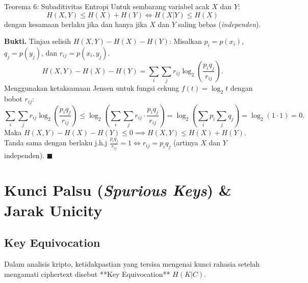 \documentclass[11pt,a4paper]{article}
\newenvironment{proof}{\noindent\textbf{Bukti.}}{\hfill$\blacksquare$\vspace{0.3em}}
\begin{document}
\begin{thmbox}{Teorema 6: Subaditivitas Entropi}
Untuk sembarang variabel acak $X$ dan $Y$:
\begin{equation}
\label{eq:subadditivity}
H(X, Y) \le H(X) + H(Y) \iff H(X|Y) \le H(X)
\end{equation}
dengan kesamaan berlaku jika dan hanya jika $X$ dan $Y$ saling bebas (\textit{independen}).
\end{thmbox}
\begin{proof}
Tinjau selisih $H(X, Y) - H(X) - H(Y)$:
Misalkan $p_i = p(x_i)$, $q_j = p(y_j)$, dan $r_{ij} = p(x_i, y_j)$.
\[
H(X, Y) - H(X) - H(Y) = \sum_{i} \sum_{j} r_{ij} \log_2\left(\frac{p_i q_j}{r_{ij}}\right).
\]
Menggunakan ketaksamaan Jensen untuk fungsi cekung $f(t) = \log_2 t$ dengan bobot $r_{ij}$:
\[
\sum_{i} \sum_{j} r_{ij} \log_2\left(\frac{p_i q_j}{r_{ij}}\right) \le \log_2\left( \sum_{i}\sum_{j} r_{ij} \cdot \frac{p_i q_j}{r_{ij}} \right) = \log_2\left(\sum_{i} p_i \sum_{j} q_j\right) = \log_2(1 \cdot 1) = 0.
\]
Maka $H(X, Y) - H(X) - H(Y) \le 0 \implies H(X, Y) \le H(X) + H(Y)$.
Tanda sama dengan berlaku j.h.j $\frac{p_i q_j}{r_{ij}} = 1 \iff r_{ij} = p_i q_j$ (artinya $X$ dan $Y$ independen).
\end{proof}

\section{Kunci Palsu (\textit{Spurious Keys}) \& Jarak Unicity}

\subsection{Key Equivocation}
Dalam analisis kripto, ketidakpastian yang tersisa mengenai kunci rahasia setelah mengamati ciphertext disebut **Key Equivocation** $H(K|C)$.
\end{document}
